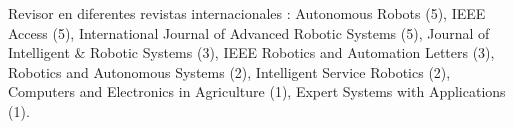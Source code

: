 \item Revisor en diferentes revistas internacionales \href{https://publons.com/author/1349368}{\faExternalLink}:  Autonomous Robots (5), IEEE Access (5), International Journal of Advanced Robotic Systems (5), Journal of Intelligent \& Robotic Systems (3), IEEE Robotics and Automation Letters (3), Robotics and Autonomous Systems (2), Intelligent Service Robotics (2), Computers and Electronics in Agriculture (1), Expert Systems with Applications (1).
